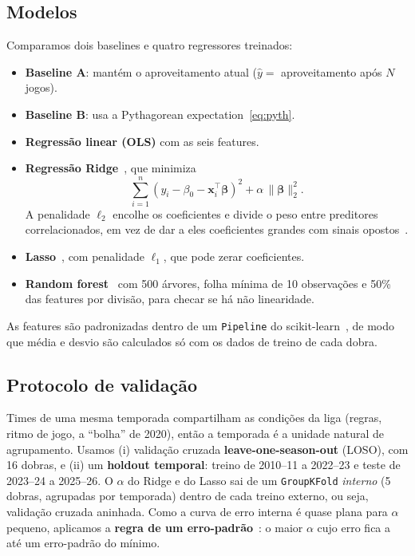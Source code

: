 \documentclass[conference]{IEEEtran}
\begin{document}
\subsection{Modelos}
Comparamos dois baselines e quatro regressores treinados:
\begin{itemize}
\item \textbf{Baseline A}: mantém o aproveitamento atual ($\hat y = $ aproveitamento após $N$ jogos).
\item \textbf{Baseline B}: usa a Pythagorean expectation~\eqref{eq:pyth}.
\item \textbf{Regressão linear (OLS)} com as seis features.
\item \textbf{Regressão Ridge}~\cite{hoerl1970}, que minimiza
\begin{equation}
\sum_{i=1}^{n}\left(y_i-\beta_0-\mathbf{x}_i^{\top}\boldsymbol{\beta}\right)^2+\alpha\,\|\boldsymbol{\beta}\|_2^2 .
\label{eq:ridge}
\end{equation}
A penalidade $\ell_2$ encolhe os coeficientes e divide o peso entre preditores correlacionados, em vez de dar a eles coeficientes grandes com sinais opostos~\cite{islr2021,esl2009}.
\item \textbf{Lasso}~\cite{tibshirani1996}, com penalidade $\ell_1$, que pode zerar coeficientes.
\item \textbf{Random forest}~\cite{breiman2001} com 500 árvores, folha mínima de 10 observações e 50\% das features por divisão, para checar se há não linearidade.
\end{itemize}
As features são padronizadas dentro de um \texttt{Pipeline} do scikit-learn~\cite{sklearn}, de modo que média e desvio são calculados só com os dados de treino de cada dobra.

\subsection{Protocolo de validação}
Times de uma mesma temporada compartilham as condições da liga (regras, ritmo de jogo, a ``bolha'' de 2020), então a temporada é a unidade natural de agrupamento. Usamos (i) validação cruzada \textbf{leave-one-season-out} (LOSO), com 16 dobras, e (ii) um \textbf{holdout temporal}: treino de 2010--11 a 2022--23 e teste de 2023--24 a 2025--26. O $\alpha$ do Ridge e do Lasso sai de um \texttt{GroupKFold} \emph{interno} (5 dobras, agrupadas por temporada) dentro de cada treino externo, ou seja, validação cruzada aninhada. Como a curva de erro interna é quase plana para $\alpha$ pequeno, aplicamos a \textbf{regra de um erro-padrão}~\cite{esl2009}: o maior $\alpha$ cujo erro fica a até um erro-padrão do mínimo.
\end{document}
